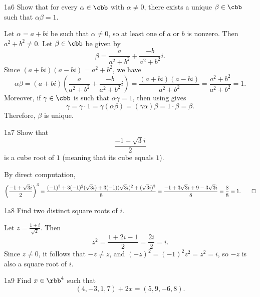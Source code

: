 \begin{exercise}{1a6}
    Show that for every $\alpha \in \cbb$ with $\alpha \neq 0$, there exists a unique $\beta \in \cbb$ such that $\alpha\beta = 1$.
\end{exercise}

\begin{sol}
    Let $\alpha = a + bi$ be such that $\alpha \neq 0$, so at least one of $a$ or $b$ is nonzero.
    Then $a^2 + b^2 \neq 0$.
    Let $\beta \in \cbb$ be given by
    \[
        \beta = \frac{a}{a^2 + b^2} + \frac{-b}{a^2 + b^2}i.
    \]
    Since $(a + bi)(a - bi) = a^2 + b^2$, we have
    \[
        \alpha\beta = (a + bi)\left(\frac{a}{a^2 + b^2} + \frac{-b}{a^2 + b^2}i\right) = \frac{(a + bi)(a - bi)}{a^2 + b^2} = \frac{a^2 + b^2}{a^2 + b^2} = 1.
    \]
    Moreover, if $\gamma \in \cbb$ is such that $\alpha\gamma = 1$, then using  gives
    \[
        \gamma = \gamma \cdot 1 = \gamma(\alpha\beta) = (\gamma\alpha)\beta = 1 \cdot \beta = \beta.
    \]
    Therefore, $\beta$ is unique.
\end{sol}

\begin{exercise}{1a7}
    Show that
    \[
    	\frac{-1 + \sqrt3i}{2}
    \]
    is a cube root of $1$ (meaning that its cube equals $1$).
\end{exercise}

\begin{sol}
    By direct computation,
    \[
        \left(\frac{-1 + \sqrt3i}{2}\right)^3 = \frac{(-1)^3 + 3(-1)^2(\sqrt3i) + 3(-1)(\sqrt3i)^2 + (\sqrt3i)^3}{8} = \frac{-1 + 3\sqrt{3}i + 9 - 3\sqrt{3}i}{8} = \frac{8}{8} = 1. \qedhere
    \]
\end{sol}

\begin{exercise}{1a8}
    Find two distinct square roots of $i$.
\end{exercise}

\begin{sol}
    Let $z = \frac{1+i}{\sqrt 2}$.
    Then
    \[
        z^2 = \frac{1+2i-1}{2} = \frac{2i}{2} = i.
    \]
    Since $z \neq 0$, it follows that $-z \neq z$, and $(-z)^2 = (-1)^2 z^2 = z^2 = i$, so $-z$ is also a square root of $i$.
\end{sol}

\begin{exercise}{1a9}
    Find $x \in \rbb^4$ such that
    \[
    	(4, -3, 1, 7) + 2x = (5, 9, -6, 8).
    \]
\end{exercise}

